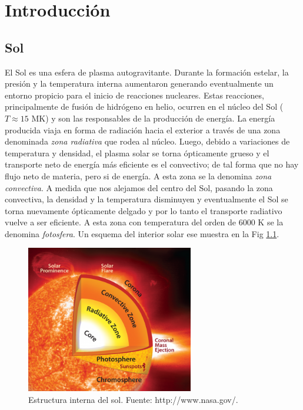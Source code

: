 \documentclass[a4paper,11pt]{report}
\begin{document}
\chapter{Introducción}\label{cap1}

\section{Sol}
El Sol es una esfera de  plasma autogravitante. Durante la formación estelar, la presión y la temperatura interna aumentaron generando eventualmente un entorno propicio para el inicio de reacciones nucleares. Estas reacciones, principalmente de fusión de hidrógeno en helio, ocurren en el núcleo del Sol ($T \approx 15$ MK) y son las responsables de la producción de energía. La energía producida viaja en forma de radiación hacia el exterior a través de una zona denominada \emph{zona radiativa} que rodea al núcleo. Luego, debido a variaciones de temperatura y densidad, el plasma solar se torna ópticamente grueso y el transporte neto de energía más eficiente es el convectivo; de tal forma que no hay flujo neto de materia, pero si de energía. A esta zona se la denomina \emph{zona convectiva}. A medida que nos alejamos del centro del Sol, pasando la zona convectiva, la densidad y la temperatura disminuyen y eventualmente el Sol se torna nuevamente ópticamente delgado y por lo tanto el transporte radiativo vuelve a ser eficiente. A esta zona con temperatura del orden de 6000 K se la denomina \emph{fotosfera}. Un esquema del interior solar ese muestra en la Fig \ref{estructura_solar}.

\begin{figure}[ht]
\begin{center}
\includegraphics[width=0.65\textwidth]{figuras/SolarStructure.png}
\end{center}
\caption{Estructura interna del sol. Fuente: http://www.nasa.gov/.}
\label{estructura_solar}
\end{figure}
\end{document}
